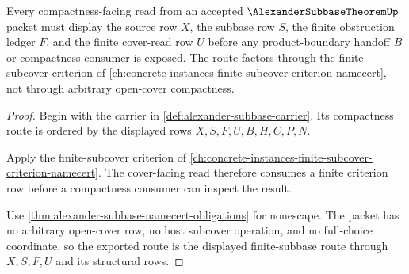 \begin{theorem}
\label{thm:alexander-subbase-finite-subcover-route}
Every compactness-facing read from an accepted $\AlexanderSubbaseTheoremUp$ packet must display the source row $X$, the subbase row $S$, the finite obstruction ledger $F$, and the finite cover-read row $U$ before any product-boundary handoff $B$ or compactness consumer is exposed. The route factors through the finite-subcover criterion of \autoref{ch:concrete-instances-finite-subcover-criterion-namecert}, not through arbitrary open-cover compactness.
\end{theorem}
\begin{proof}
Begin with the carrier in \autoref{def:alexander-subbase-carrier}. Its compactness route is ordered by the displayed rows $X,S,F,U,B,H,C,P,N$.

Apply the finite-subcover criterion of \autoref{ch:concrete-instances-finite-subcover-criterion-namecert}. The cover-facing read therefore consumes a finite criterion row before a compactness consumer can inspect the result.

Use \autoref{thm:alexander-subbase-namecert-obligations} for nonescape. The packet has no arbitrary open-cover row, no host subcover operation, and no full-choice coordinate, so the exported route is the displayed finite-subbase route through $X,S,F,U$ and its structural rows.
\end{proof}


\begin{closurestatus}{\AlexanderSubbaseTheoremUp}
  \theoryclosure{\seedClosure}
  \formalstatus{\unformalizedV}
\end{closurestatus}
